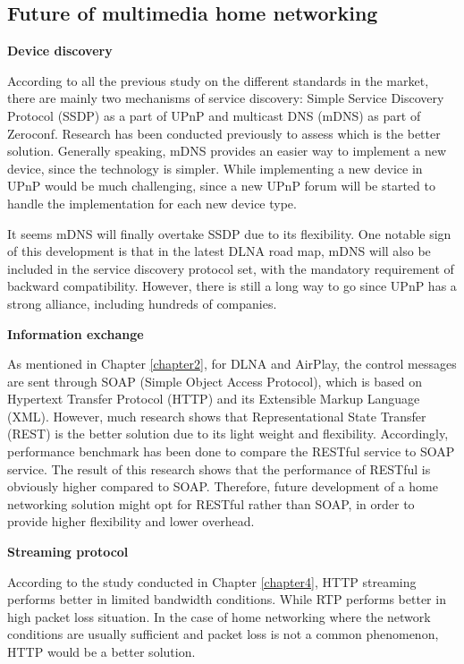 \subsection{Future of multimedia home networking\label{5_3}}
\textbf{Device discovery}

According to all the previous study on the different standards in the market,
there are mainly two mechanisms of service discovery: Simple Service
Discovery Protocol (SSDP) as a part of UPnP and multicast DNS (mDNS) as part of
Zeroconf. Research \cite{zeroconf_vs_upnp} has been conducted previously to
assess which is the better solution. Generally speaking, mDNS provides an
easier way to implement a new device, since the technology is simpler. While
implementing a new device in UPnP would be much challenging, since a new UPnP
forum will be started to handle the implementation for each new device type.

It seems mDNS will finally overtake SSDP due to its flexibility. One notable
sign of this development is that in the latest DLNA road map, mDNS will also be
included in the service discovery protocol set, with the mandatory requirement
of backward compatibility. However, there is still a long way to go since UPnP
has a strong alliance, including hundreds of companies.

\textbf{Information exchange}

As mentioned in Chapter \ref{chapter2}, for DLNA and AirPlay, the control
messages are sent through SOAP (Simple Object Access Protocol), which is based on
Hypertext Transfer Protocol (HTTP) and its Extensible Markup Language (XML).
However, much research \cite{restful_webservice} shows that Representational
State Transfer (REST) is the better solution due to its light weight and
flexibility. Accordingly, performance benchmark \cite{performance_restful_saop}
has been done to compare the RESTful service to SOAP service. The result of this
research shows that the performance of RESTful is obviously higher compared to
SOAP. Therefore, future development of a home networking solution might opt for
RESTful rather than SOAP, in order to provide higher flexibility and lower
overhead.

\textbf{Streaming protocol}

According to the study conducted in Chapter \ref{chapter4}, HTTP streaming
performs better in limited bandwidth conditions. While RTP performs better in
high packet loss situation. In the case of home networking where the network
conditions are usually sufficient and packet loss is not a common phenomenon,
HTTP would be a better solution.

